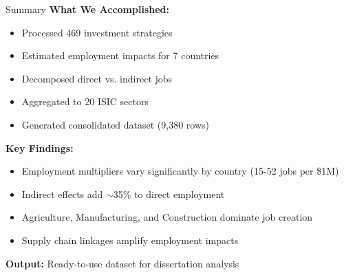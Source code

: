 \documentclass[10pt]{beamer}
\begin{document}
\begin{frame}{Summary}
\textbf{What We Accomplished:}

\vspace{0.3cm}

\begin{itemize}
    \item Processed 469 investment strategies
    \item Estimated employment impacts for 7 countries
    \item Decomposed direct vs. indirect jobs
    \item Aggregated to 20 ISIC sectors
    \item Generated consolidated dataset (9,380 rows)
\end{itemize}

\vspace{0.5cm}

\textbf{Key Findings:}

\vspace{0.3cm}

\begin{itemize}
    \item Employment multipliers vary significantly by country (15-52 jobs per \$1M)
    \item Indirect effects add $\sim$35\% to direct employment
    \item Agriculture, Manufacturing, and Construction dominate job creation
    \item Supply chain linkages amplify employment impacts
\end{itemize}

\vspace{0.5cm}

\textbf{Output:} Ready-to-use dataset for dissertation analysis
\end{frame}
\end{document}
